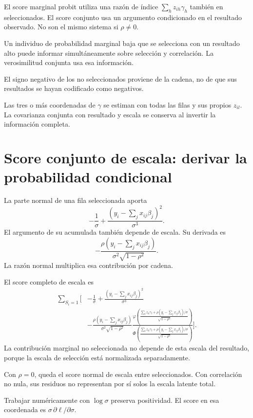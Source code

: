 \documentclass[11pt,a4paper]{article}
\begin{document}
El score marginal probit
utiliza una razón de
índice \(\sum_hz_{ih}\gamma_h\)
también en seleccionados.
El score conjunto usa
un argumento condicionado
en el resultado observado.
No son el mismo sistema
si \(\rho\ne0\).

\begin{ejemplo}
Un individuo de probabilidad
marginal baja que se
selecciona con un resultado
alto puede informar
simultáneamente sobre selección
y correlación.
La verosimilitud conjunta
usa esa información.
\end{ejemplo}
El signo negativo de
los no seleccionados
proviene de la cadena,
no de que sus
resultados se hayan
codificado como negativos.

Las tres o más
coordenadas de \(\gamma\)
se estiman con todas
las filas y sus
propios \(z_{il}\).
La covarianza conjunta
con resultado y escala
se conserva al invertir
la información completa.

\clearpage
\section{Score conjunto de escala: derivar la probabilidad condicional}\label{unidad145}
La parte normal de una
fila seleccionada aporta
\[
-\frac1\sigma+
\frac{(y_i-\sum_jx_{ij}\beta_j)^2}{\sigma^3}.
\]
El argumento de su
acumulada también depende de escala.
Su derivada es
\[
-\frac{\rho(y_i-\sum_jx_{ij}\beta_j)}
{\sigma^2\sqrt{1-\rho^2}}.
\]
La razón normal multiplica
esa contribución por cadena.

El score completo de escala es
\[
\begin{aligned}
\sum_{S_i=1}\Bigg[
&-\frac1\sigma+
\frac{(y_i-\sum_jx_{ij}\beta_j)^2}{\sigma^3}\\
&-\frac{\rho(y_i-\sum_jx_{ij}\beta_j)}
{\sigma^2\sqrt{1-\rho^2}}
\frac{
\varphi\left(\frac{\sum_lz_{il}\gamma_l+
\rho(y_i-\sum_jx_{ij}\beta_j)/\sigma}{\sqrt{1-\rho^2}}\right)}
{\Phi\left(\frac{\sum_lz_{il}\gamma_l+
\rho(y_i-\sum_jx_{ij}\beta_j)/\sigma}{\sqrt{1-\rho^2}}\right)}
\Bigg].
\end{aligned}
\]
La contribución marginal no
seleccionada no depende
de esta escala del
resultado, porque la
escala de selección está
normalizada separadamente.

\begin{ejemplo}[Independencia]
Con \(\rho=0\), queda
el score normal de
escala entre seleccionados.
Con correlación no nula,
sus residuos no representan
por sí solos la
escala latente total.
\end{ejemplo}
Trabajar numéricamente con
\(\log\sigma\) preserva
positividad. El score en
esa coordenada es
\(\sigma\,\partial\ell/\partial\sigma\).
\end{document}
